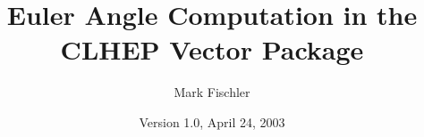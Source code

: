 
\flushbottom
\pagestyle{headings}

\setlength{\topmargin}{0.0in}
\setlength{\textwidth}{5.5in}
\setlength{\oddsidemargin}{.5in}
\setlength{\evensidemargin}{.5in}
\setlength{\textheight}{8.5in}

\addtolength{\parskip}{2pt}

\newcommand{\fpcl}{{\sc fpcl}}

\def \Point {{\tt Point3D}}
\def \Line {{\tt Line3D}}
\def \Direction {{\tt Direction}}
\def \UnitVector {{\tt UnitVector}}
\def \Plane {{\tt Plane3D}}
\def \SpaceVector {{\tt SpaceVector}}
\def \SV {{\tt Hep3Vector}}
\def \SVz {{\tt SpaceVector}}
\def \UV {{\tt UnitVector}}
\def \TangentVector {{\tt TangentVector}}
\def \TV {{\tt TangentVector}}
\def \Ro {{\tt HepRotation}}
\def \Ros {{\tt Rotation}}
\def \Rotation {{\tt Rotation}}
\def \RotationZ {{\tt HepRotationZ}}
\def \Transformation {{\tt Transformation}}
\def \Euclidean {{\tt EuclideanTransformation}}
\def \Angle {{\tt Angle}}
\def \LorentzVector {{\tt LorentzVector}}
\def \LorentzTransformation {{\tt LorentzTransformation}}
\def \LV {{\tt HepLorentzVector}}
\def \LVz {{\tt LorentzVector}}
\def \LT {{\tt HepLorentzRotation}}
\def \LTs {{\tt LorentzTransformation}}
\def \LB {{\tt HepBoost}}
\def \LBs {{\tt LorentzBoost}}
\def \PolarAngle {{\tt PolarAngle}}
\def \PAngle {{\tt PAngle}}
\def \AzimuthalAngle {{\tt AzimuthalAngle}}
\def \AAngle {{\tt AAngle}}
\def \EB {{\tt EBvector}}
\def \AV {{\tt Adjoint3Vector}}
\def \ALV {{\tt Adjoint4Vector}}
\def \Scalar {{\tt Scalar}}
\def \Ax {{\tt HepAxisAngle}}
\def \Es {{\tt HepEulerAngles}}

\newcommand {\see}[1] {\hfill$\triangleright$ see eqn.~#1}

\newenvironment{shortlist}{%
\begin{itemize}
\setlength{\itemsep}{0pt}
\setlength{\parskip}{0pt}
}{%
\end{itemize}
}

\setcounter{secnumdepth}{2}	%
\setcounter{tocdepth}{2}	%



\title{Euler Angle Computation in the CLHEP {\bf Vector} Package}

\author{Mark Fischler}
\date{Version 1.0, April 24, 2003}
\maketitle

